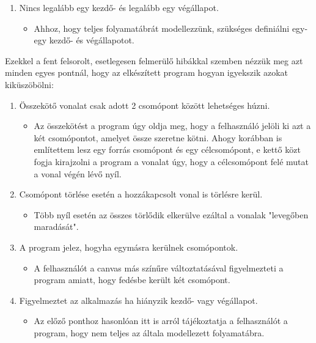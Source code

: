 \begin{enumerate}
\item Nincs legalább egy kezdő- és legalább egy végállapot.

\begin{itemize}
\item Ahhoz, hogy teljes folyamatábrát modellezzünk, szükséges definiálni egy-egy kezdő- és végállapotot.
\end{itemize}

\end{enumerate}

Ezekkel a fent felsorolt, esetlegesen felmerülő hibákkal szemben nézzük meg azt minden egyes pontnál, hogy az elkészített program hogyan igyekszik azokat kiküszöbölni:

\begin{enumerate}
\item Összekötő vonalat csak adott 2 csomópont között lehetséges húzni.

\begin{itemize}
\item Az összekötést a program úgy oldja meg, hogy a felhasználó jelöli ki azt a két csomópontot, amelyet össze szeretne kötni. Ahogy korábban is említettem lesz egy forrás csomópont és egy célcsomópont, e kettő közt fogja kirajzolni a program a vonalat úgy, hogy a célcsomópont felé mutat a vonal végén lévő nyíl.
\end{itemize}

\item Csomópont törlése esetén a hozzákapcsolt vonal is törlésre kerül.

\begin{itemize}
\item Több nyíl esetén az összes törlődik elkerülve ezáltal a vonalak "levegőben maradását".
\end{itemize}

\item A program jelez, hogyha egymásra kerülnek csomópontok.

\begin{itemize}
\item A felhasználót a canvas más színűre változtatásával figyelmezteti a program amiatt, hogy fedésbe került két csomópont.
\end{itemize}

\item Figyelmeztet az alkalmazás ha hiányzik kezdő- vagy végállapot.

\begin{itemize}
\item Az előző ponthoz hasonlóan itt is arról tájékoztatja a felhasználót a program, hogy nem teljes az általa modellezett folyamatábra.
\end{itemize}

\end{enumerate}

